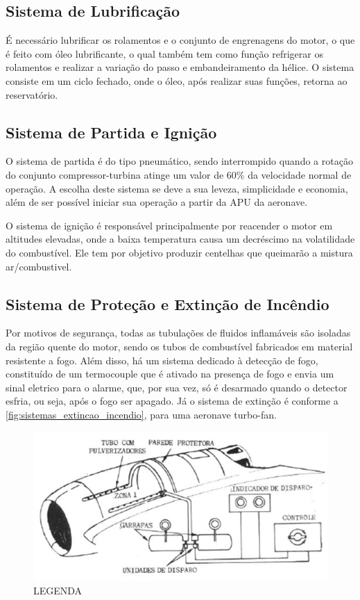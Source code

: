 \subsection{Sistema de Lubrificação}

É necessário lubrificar os rolamentos e o conjunto de engrenagens do motor, o que é feito com óleo lubrificante, o qual também tem como função refrigerar os rolamentos e realizar a variação do passo e embandeiramento da hélice.
O sistema consiste em um ciclo fechado, onde o óleo, após realizar suas funções, retorna ao reservatório.

\subsection{Sistema de Partida e Ignição}

O sistema de partida é do tipo pneumático, sendo interrompido quando a rotação do conjunto compressor-turbina atinge um valor de 60\% da velocidade normal de operação.
A escolha deste sistema se deve a sua leveza, simplicidade e economia, além de ser possível iniciar sua operação a partir da APU da aeronave.

O sistema de ignição é responsável principalmente por reacender o motor em altitudes elevadas, onde a baixa temperatura causa um decréscimo na volatilidade do combustível.
Ele tem por objetivo produzir centelhas que queimarão a mistura ar/combustivel.

\subsection{Sistema de Proteção e Extinção de Incêndio}

Por motivos de segurança, todas as tubulações de fluidos inflamáveis são isoladas da região quente do motor, sendo os tubos de combustível fabricados em material resistente a fogo.
Além disso, há um sistema dedicado à detecção de fogo, constituído de um termocouple que é ativado na presença de fogo e envia um sinal eletrico para o alarme, que, por sua vez, só é desarmado quando o detector esfria, ou seja, após o fogo ser apagado.
Já o sistema de extinção é conforme a \autoref{fig:sistemas_extincao_incendio}, para uma aeronave turbo-fan.

\begin{figure}
\centering
\includegraphics{images/parte3/sistemas_extincao_incendio.png}
\caption{LEGENDA}
\label{fig:sistemas_extincao_incendio}
\end{figure}


